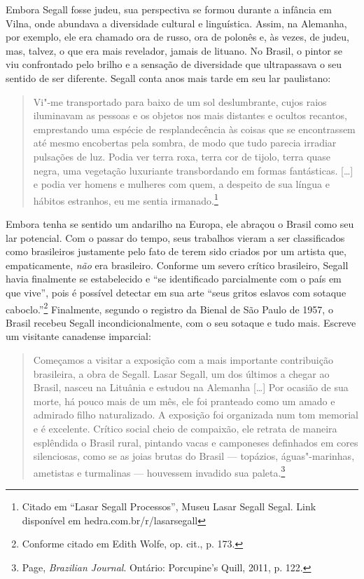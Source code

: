 Embora Segall fosse judeu, sua perspectiva se formou durante a infância
em Vilna, onde abundava a diversidade cultural e linguística. Assim, na
Alemanha, por exemplo, ele era chamado ora de russo, ora de polonês e,
às vezes, de judeu, mas, talvez, o que era mais revelador, jamais de
lituano. No Brasil, o pintor se viu confrontado pelo brilho e a sensação
de diversidade que ultrapassava o seu sentido de ser diferente. Segall conta anos mais
tarde em seu lar paulistano:

\begin{quote}
Vi"-me
transportado para baixo de um sol deslumbrante, cujos raios iluminavam as pessoas e os
objetos nos mais distantes e ocultos recantos, emprestando uma espécie
de resplandecência às coisas que se encontrassem até mesmo encobertas
pela sombra, de modo que tudo parecia irradiar pulsações de luz. Podia
ver terra roxa, terra cor de tijolo, terra quase negra, uma vegetação
luxuriante transbordando em formas fantásticas. {[}\ldots{}{]} e podia
ver homens e mulheres com quem, a despeito de sua língua e hábitos
estranhos, eu me sentia irmanado.\footnote{Citado em ``Lasar Segall
  Processos'', Museu Lasar Segall Segal. Link disponível em hedra.com.br/r/lasarsegall} 
\end{quote}

Embora tenha se sentido um andarilho na
Europa, ele abraçou o Brasil como seu lar potencial. Com o passar do
tempo, seus trabalhos vieram a ser classificados como brasileiros
justamente pelo fato de terem sido criados por um artista que,
empaticamente, \textit{não} era brasileiro. Conforme um severo crítico
brasileiro, Segall havia finalmente se estabelecido e ``se identificado
parcialmente com o país em que vive'', pois é possível detectar em sua
arte ``seus gritos eslavos com sotaque caboclo.''\footnote{Conforme
  citado em Edith Wolfe, op. cit., p. 173.} Finalmente, segundo o registro da Bienal
de São Paulo de 1957, o Brasil recebeu Segall incondicionalmente, com o
seu sotaque e tudo mais. Escreve um
visitante canadense imparcial:

\begin{quote}
Começamos a visitar a exposição com a mais importante contribuição
brasileira, a obra de Segall. Lasar Segall, um dos últimos a chegar ao
Brasil, nasceu na Lituânia e estudou na Alemanha {[}\ldots{}{]} Por
ocasião de sua morte, há pouco mais de um mês, ele foi pranteado como um
amado e admirado filho naturalizado. A exposição foi organizada num tom
memorial e é excelente. Crítico social cheio de compaixão, ele retrata
de maneira esplêndida o Brasil rural, pintando vacas e camponeses
definhados em cores silenciosas, como se as joias brutas do Brasil ---
topázios, águas"-marinhas, ametistas e turmalinas --- houvessem invadido
sua paleta.\footnote{ Page, \textit{Brazilian Journal}. Ontário: Porcupine's Quill, 2011, p.
  122.}
\end{quote}

